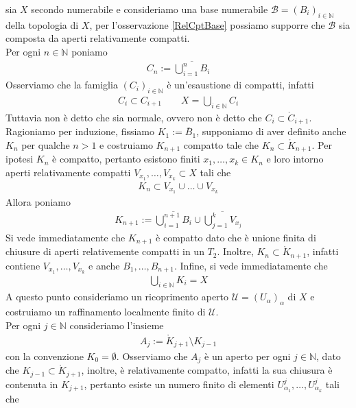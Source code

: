 \documentclass[oneside, 11pt]{amsbook}
\makeatletter
\newcommand{\B}{\mathcal{B}}
\newcommand{\U}{\mathcal{U}}
\newcommand{\N}{{\mathbb N}}
\newcommand{\0}{{(0)}}
\newcommand{\3}{{(3)}}
\theoremstyle{colonplain}
\theoremstyle{colondefinition}
\theoremstyle{colonremark}
\numberwithin{equation}{chapter}
\renewcommand{\proofname}{Dimostrazione}
\renewenvironment{proof}[1][\proofname]{\par
  \pushQED{\qed}%
  \normalfont \topsep6\p@\@plus6\p@\relax
  \trivlist
  \item[\hskip\labelsep\bfseries #1:]\ignorespaces
}{%
  \popQED\endtrivlist\@endpefalse
}
\makeatother
\begin{document}
\begin{proof}
    sia $X$ secondo numerabile e consideriamo una base numerabile $\B = (B_i)_{i \in \N}$ della topologia di $X$, per l'osservazione \ref{RelCptBase} possiamo supporre che $\B$ sia composta da aperti relativamente compatti. \\
    Per ogni $n \in \N$ poniamo
    \begin{align}
        C_n := \overline{\bigcup_{i = 1}^n B_i}
    \end{align}
    Osserviamo che la famiglia $(C_i)_{i \in \N}$ è un'esaustione di compatti, infatti
    \begin{align}
        C_i \subset C_{i + 1} \qquad X = \bigcup_{i \in \N} C_i
    \end{align}
    Tuttavia non è detto che sia normale, ovvero non è detto che $C_i \subset \mathring{C}_{i + 1}$. \\
    Ragioniamo per induzione, fissiamo $K_1 := \overline{B}_1$, supponiamo di aver definito anche $K_n$ per qualche $n > 1$ e costruiamo $K_{n + 1}$ compatto tale che $K_n \subset \mathring{K}_{n + 1}$. Per ipotesi $K_n$ è compatto, pertanto esistono finiti $x_1, \dots, x_k \in K_n$ e loro intorno aperti relativamente compatti $V_{x_1}, \dots, V_{x_k} \subset X$ tali che
    \begin{align}
        K_n \subset V_{x_1} \cup \dots \cup V_{x_k}
    \end{align}
    Allora poniamo
    \begin{align}
        K_{n + 1} := \overline{\bigcup_{i = 1}^{n + 1} B_i} \cup \overline{\bigcup_{j = 1}^k V_{x_j}}
    \end{align}
    Si vede immediatamente che $K_{n + 1}$ è compatto dato che è unione finita di chiusure di aperti relativemente compatti in un $T_2$. Inoltre, $K_n \subset \mathring{K}_{n + 1}$, infatti contiene $V_{x_1}, \dots, V_{x_k}$ e anche $B_1, \dots, B_{n + 1}$. Infine, si vede immediatamente che
    \begin{align}
        \bigcup_{i \in \N} K_i = X
    \end{align}
    A questo punto consideriamo un ricoprimento aperto $\U = (U_\alpha)_\alpha$ di $X$ e costruiamo un raffinamento localmente finito di $\U$. \\
    Per ogni $j \in \N$ consideriamo l'insieme
    \begin{align}
        A_j := \mathring{K}_{j + 1} \setminus K_{j - 1}
    \end{align}
    con la convenzione $K_0 = \emptyset$. Osserviamo che $A_j$ è un aperto per ogni $j \in \N$, dato che $K_{j - 1} \subset \mathring{K}_{j + 1}$, inoltre, è relativamente compatto, infatti la sua chiusura è contenuta in $K_{j + 1}$, pertanto esiste un numero finito di elementi $U^j_{\alpha_1}, \dots, U^j_{\alpha_k}$ tali che

\end{proof}
\end{document}
